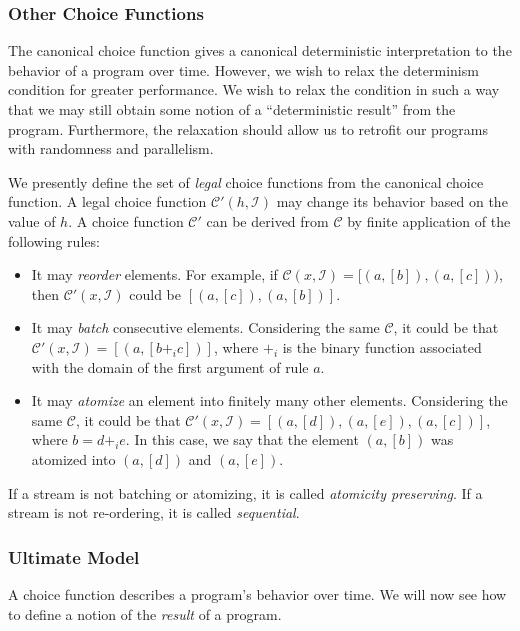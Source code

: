 \subsubsection{Other Choice Functions}

The canonical choice function gives a canonical deterministic interpretation to the behavior of a program over time.  However, we wish to relax the determinism condition for greater performance.  We wish to relax the condition in such a way that we may still obtain some notion of a ``deterministic result'' from the program.  Furthermore, the relaxation should allow us to retrofit our programs with randomness and parallelism.

We presently define the set of {\em legal} choice functions from the canonical choice function.  A legal choice function $\mathcal{C}'(h,\mathcal{I})$ may change its behavior based on the value of $h$.  A choice function $\mathcal{C}'$ can be derived from $\mathcal{C}$ by finite application of the following rules:

\begin{itemize}
\item It may {\em reorder} elements.  For example, if $\mathcal{C}(x,\mathcal{I}) = [(a,[b]), (a,[c]))$, then $\mathcal{C}'(x,\mathcal{I})$ could be $[(a,[c]),(a,[b])]$.

\item It may {\em batch} consecutive elements.  Considering the same $\mathcal{C}$, it could be that $\mathcal{C}'(x,\mathcal{I}) = [(a,[b +_i c])]$, where $+_i$ is the binary function associated with the domain of the first argument of rule $a$.

\item It may {\em atomize} an element into finitely many other elements.  Considering the same $\mathcal{C}$, it could be that $\mathcal{C}'(x,\mathcal{I}) = [(a,[d]), (a,[e]), (a,[c])]$, where $b = d +_i e$.  In this case, we say that the element $(a,[b])$ was atomized into $(a,[d])$ and $(a,[e])$.
\end{itemize}

If a stream is not batching or atomizing, it is called {\em atomicity preserving}.  If a stream is not re-ordering, it is called {\em sequential}.


\subsubsection{Ultimate Model}

A choice function describes a program's behavior over time.  We will now see how to define a notion of the {\em result} of a program.

